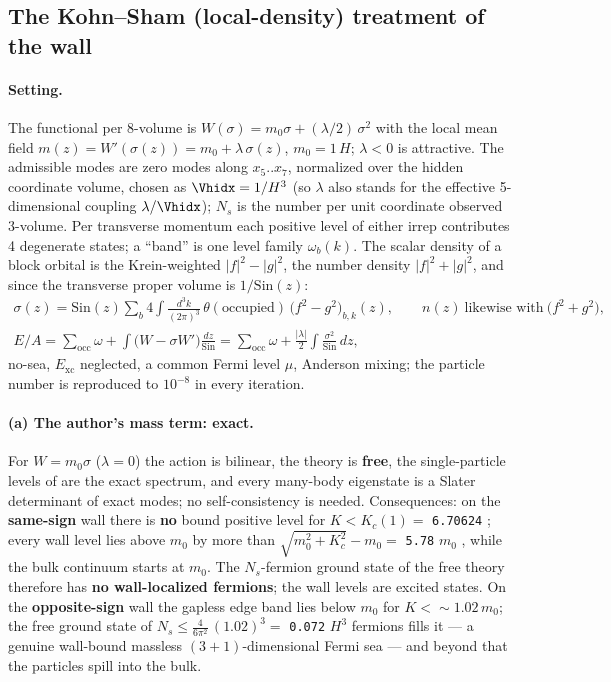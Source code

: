 \subsection[{The Kohn--Sham (local-density) treatment of the wall [WG 6]}]{The Kohn--Sham (local-density) treatment of the wall }
\label{sec:8.6}

\paragraph{Setting.} The functional per 8-volume is $W(\sigma)=m_0\sigma+(\lambda/2)\,\sigma^2$ with the
local mean field $m(z)=W'(\sigma(z))=m_0+\lambda\,\sigma(z)$, $m_0=1\,H$; $\lambda<0$ is attractive. The
admissible modes are zero modes along $x_5..x_7$, normalized over the hidden coordinate volume, chosen as
$\Vhidx=1/H^3$ (so $\lambda$ also stands for the effective 5-dimensional coupling $\lambda/\Vhidx$); $N_s$ is
the number per unit coordinate observed 3-volume. Per transverse momentum each positive level of either
irrep contributes 4 degenerate states; a ``band'' is one level family $\omega_b(k)$. The scalar density of
a block orbital is the Krein-weighted $|f|^2-|g|^2$, the number density $|f|^2+|g|^2$, and since the
transverse proper volume is $1/\mathrm{Sin}(z)$:
\begin{gather*}
  \sigma(z)=\mathrm{Sin}(z)\sum_b4\int\frac{d^3k}{(2\pi)^3}\,\theta(\text{occupied})\,\bigl(f^2-g^2\bigr)_{b,k}(z),\qquad
  n(z)\ \text{likewise with}\ \bigl(f^2+g^2\bigr),\\
  E/A=\sum_{\mathrm{occ}}\omega+\int\bigl(W-\sigma W'\bigr)\frac{dz}{\mathrm{Sin}}
  =\sum_{\mathrm{occ}}\omega+\frac{|\lambda|}{2}\int\frac{\sigma^2}{\mathrm{Sin}}\,dz ,
\end{gather*}
no-sea, $E_{\mathrm{xc}}$ neglected, a common Fermi level $\mu$, Anderson mixing; the particle number is
reproduced to $10^{-8}$ in every iteration.

\paragraph{(a) The author's mass term: exact.} For $W=m_0\sigma$ ($\lambda=0$) the action is bilinear, the
theory is \textbf{free}, the single-particle levels of  are the exact spectrum, and every
many-body eigenstate is a Slater determinant of exact modes; no self-consistency is needed. Consequences:
on the \textbf{same-sign} wall there is \textbf{no} bound positive level for $K<K_c(1)=$ \texttt{6.70624}
; every wall level lies above $m_0$ by more than
$\sqrt{m_0^2+K_c^2}-m_0=$ \texttt{5.78} $m_0$ , while the bulk continuum starts at
$m_0$. The $N_s$-fermion ground state of the free theory therefore has \textbf{no wall-localized fermions};
the wall levels are excited states. On the \textbf{opposite-sign} wall the gapless edge band lies below
$m_0$ for $K<{\sim}1.02\,m_0$; the free ground state of $N_s\leq\frac{4}{6\pi^2}\,(1.02)^3=$ \texttt{0.072} $H^3$
 fermions fills it --- a genuine wall-bound massless $(3+1)$-dimensional Fermi sea ---
and beyond that the particles spill into the bulk.

